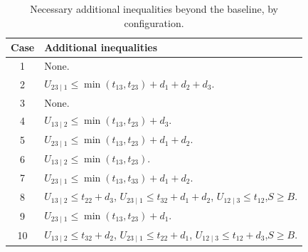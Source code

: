 \documentclass[a4paper,11pt]{amsart}
\numberwithin{equation}{section}
\theoremstyle{definition}
\theoremstyle{remark}
\begin{document}
\begin{table}[htbp]
\centering\small
\caption{Necessary additional inequalities beyond the baseline, by configuration.}
\label{tab:extras}
\begin{tabular}{cp{11.6cm}}
\toprule
Case & Additional inequalities\\
\midrule
1 & None.\\
2 & $U_{23\mid1}\leq\min(t_{13},t_{23})+d_1+d_2+d_3$.\\
3 & None.\\
4 & $U_{13\mid2}\leq\min(t_{13},t_{23})+d_3$.\\
5 & $U_{23\mid1}\leq\min(t_{13},t_{23})+d_1+d_2$.\\
6 & $U_{13\mid2}\leq\min(t_{13},t_{23})$.\\
7 & $U_{23\mid1}\leq\min(t_{13},t_{33})+d_1+d_2$.\\
8 & $U_{13\mid2}\leq t_{22}+d_3$,\quad
    $U_{23\mid1}\leq t_{32}+d_1+d_2$,\newline
    $U_{12\mid3}\leq t_{12}$,\quad $S\geq B$.\\
9 & $U_{23\mid1}\leq\min(t_{13},t_{23})+d_1$.\\
10& $U_{13\mid2}\leq t_{32}+d_2$,\quad
    $U_{23\mid1}\leq t_{22}+d_1$,\newline
    $U_{12\mid3}\leq t_{12}+d_3$,\quad $S\geq B$.\\
\bottomrule
\end{tabular}
\end{table}
\end{document}
